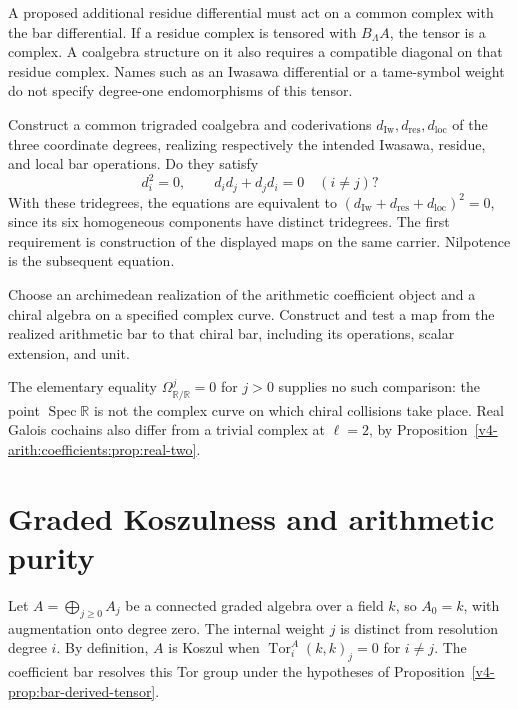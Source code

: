 A proposed additional residue differential must act on a common
complex with the bar differential. If a residue complex is tensored
with \(B_\Lambda A\), the tensor is a complex. A coalgebra structure
on it also requires a compatible diagonal on that residue complex.
Names such as an Iwasawa differential or a tame-symbol weight do not
specify degree-one endomorphisms of this tensor.

\begin{question}
\label{v4-arith:bar:conj:dAr-square-zero}
Construct a common trigraded coalgebra and coderivations
\(d_{\mathrm{Iw}},d_{\mathrm{res}},d_{\mathrm{loc}}\) of the three
coordinate degrees, realizing respectively the intended Iwasawa,
residue, and local bar operations. Do they satisfy
\[
 d_i^2=0,\qquad d_id_j+d_jd_i=0\quad(i\ne j)?
\]
With these tridegrees, the equations are equivalent to
\((d_{\mathrm{Iw}}+d_{\mathrm{res}}+d_{\mathrm{loc}})^2=0\), since
its six homogeneous components have distinct tridegrees.
The first requirement is construction of the displayed maps on the
same carrier. Nilpotence is the subsequent equation.
\end{question}

\begin{question}
\label{v4-arith:thm:archimedean-reduction}
Choose an archimedean realization of the arithmetic coefficient
object and a chiral algebra on a specified complex curve. Construct
and test a map from the realized arithmetic bar to that chiral bar,
including its operations, scalar extension, and unit.
\end{question}

The elementary equality
\(\Omega^j_{\mathbb R/\mathbb R}=0\) for \(j>0\) supplies no such
comparison: the point \(\operatorname{Spec}\mathbb R\) is not the
complex curve on which chiral collisions take place. Real Galois
cochains also differ from a trivial complex at \(\ell=2\), by
Proposition~\ref{v4-arith:coefficients:prop:real-two}.

\section{Graded Koszulness and arithmetic purity}
\label{v4-arith:bar:koszulness}

Let \(A=\bigoplus_{j\geq0}A_j\) be a connected graded algebra over
a field \(k\), so \(A_0=k\), with augmentation onto degree zero.
The internal weight \(j\) is distinct from resolution degree \(i\).
By definition, \(A\) is Koszul when
\(\operatorname{Tor}^A_i(k,k)_j=0\) for \(i\ne j\).
The coefficient bar resolves this Tor group under the hypotheses of
Proposition~\ref{v4-prop:bar-derived-tensor}.

